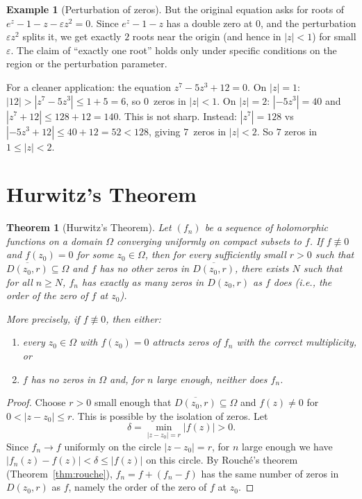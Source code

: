 \documentclass[12pt,a4paper,openany]{book}
\theoremstyle{definition}
\newtheorem{example}[definition]{Example}
\theoremstyle{plain}
\newtheorem{theorem}[definition]{Theorem}
\theoremstyle{remark}
\newcommand{\abs}[1]{\left|#1\right|}
\begin{document}
\begin{example}[Perturbation of zeros]
But the original equation asks for roots of $e^z - 1 - z - \varepsilon z^2 = 0$.
Since $e^z - 1 - z$ has a double zero at $0$, and the perturbation
$\varepsilon z^2$ splits it, we get exactly $2$ roots near the origin
(and hence in $\abs{z}<1$) for small $\varepsilon$. The claim of ``exactly one root''
holds only under specific conditions on the region or the
perturbation parameter.

For a cleaner application: the equation $z^7 - 5z^3 + 12 = 0$.
On $\abs{z}=1$: $\abs{12} > \abs{z^7 - 5z^3} \leq 1 + 5 = 6$, so $0$~zeros
in $\abs{z}<1$. On $\abs{z}=2$: $\abs{-5z^3}=40$ and $\abs{z^7+12} \leq 128+12=140$.
This is not sharp. Instead: $\abs{z^7}=128$ vs $\abs{-5z^3+12}\leq 40+12=52<128$,
giving $7$~zeros in $\abs{z}<2$. So $7$ zeros in $1\leq\abs{z}<2$.
\end{example}

\section{Hurwitz's Theorem}\label{sec:hurwitz}

\begin{theorem}[Hurwitz's Theorem]\label{thm:hurwitz}
Let $(f_n)$ be a sequence of holomorphic functions on a domain $\Omega$
converging uniformly on compact subsets to $f$. If $f \not\equiv 0$
and $f(z_0) = 0$ for some $z_0 \in \Omega$, then for every sufficiently
small $r > 0$ such that $\overline{D(z_0, r)} \subseteq \Omega$ and $f$
has no other zeros in $\overline{D(z_0, r)}$, there exists $N$ such
that for all $n \geq N$, $f_n$ has exactly as many zeros in $D(z_0, r)$
as $f$ does (i.e., the order of the zero of $f$ at $z_0$).

More precisely, if $f \not\equiv 0$, then either:
\begin{enumerate}[label=(\roman*)]
  \item every $z_0 \in \Omega$ with $f(z_0) = 0$ attracts zeros of $f_n$
    with the correct multiplicity, or
  \item $f$ has no zeros in $\Omega$ and, for $n$ large enough, neither
    does $f_n$.
\end{enumerate}
\end{theorem}

\begin{proof}
Choose $r > 0$ small enough that $\overline{D(z_0,r)} \subseteq \Omega$
and $f(z) \neq 0$ for $0 < \abs{z - z_0} \leq r$. This is possible by
the isolation of zeros. Let
\[
  \delta = \min_{\abs{z-z_0}=r} \abs{f(z)} > 0.
\]
Since $f_n \to f$ uniformly on the circle $\abs{z-z_0} = r$, for $n$
large enough we have $\abs{f_n(z) - f(z)} < \delta \leq \abs{f(z)}$ on
this circle. By Rouch\'{e}'s theorem (Theorem~\ref{thm:rouche}), $f_n = f + (f_n - f)$
has the same number of zeros in $D(z_0, r)$ as $f$, namely the order of
the zero of $f$ at $z_0$.
\end{proof}
\end{document}
